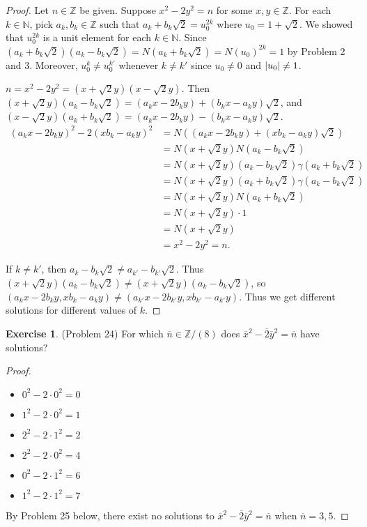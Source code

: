 \documentclass[12pt, psamsfonts]{amsart}
\theoremstyle{definition}
\newtheorem*{exer}{Exercise}
\theoremstyle{remark}
\numberwithin{equation}{section}
\begin{document}
\begin{proof}
  Let $n \in \mathbb{Z}$ be given.
  Suppose $x^2 - 2y^2 = n$ for some $x, y \in \mathbb{Z}$.
  For each $k \in \mathbb{N}$, pick $a_k, b_k \in \mathbb{Z}$ such that $a_k + b_k\sqrt{2} = u_0^{2k}$ where $u_0 = 1 + \sqrt{2}$.
  We showed that $u_0^{2k}$ is a unit element for each $k \in \mathbb{N}$.
  Since $(a_k + b_k\sqrt{2})(a_k - b_k\sqrt{2}) = N(a_k + b_k\sqrt{2}) = N(u_0)^{2k} = 1$ by Problem 2 and 3.
  Moreover, $u_0^k \ne u_0^{k'}$ whenever $k \ne k'$ since $u_0 \ne 0$ and $\abs{u_0} \ne 1$.

  $n = x^2 - 2y^2 = (x + \sqrt{2}y)(x - \sqrt{2}y)$.
  Then $(x + \sqrt{2}y)(a_k - b_k\sqrt{2}) = (a_kx - 2b_ky) + (b_kx - a_ky)\sqrt{2}$, and $(x - \sqrt{2}y)(a_k + b_k\sqrt{2}) = (a_kx - 2b_ky) - (b_kx - a_ky)\sqrt{2}$.
  \begin{align*}
    (a_kx - 2b_ky)^2 - 2(xb_k - a_ky)^2
      &= N((a_kx - 2b_ky) + (xb_k - a_ky)\sqrt{2}) \\
      &= N(x + \sqrt{2}y)N(a_k - b_k\sqrt{2}) \\
      &= N(x + \sqrt{2}y)(a_k - b_k\sqrt{2})\gamma(a_k + b_k\sqrt{2}) \\
      &= N(x + \sqrt{2}y)(a_k + b_k\sqrt{2})\gamma(a_k - b_k\sqrt{2}) \\
      &= N(x + \sqrt{2}y)N(a_k + b_k\sqrt{2}) \\
      &= N(x + \sqrt{2}y) \cdot 1 \\
      &= N(x + \sqrt{2}y) \\
      &= x^2 - 2y^2 = n.
  \end{align*}

  If $k \ne k'$, then $a_k - b_k\sqrt{2} \ne a_{k'} - b_{k'}\sqrt{2}$.
  Thus $(x + \sqrt{2}y)(a_k - b_k\sqrt{2}) \ne (x + \sqrt{2}y)(a_k - b_k\sqrt{2})$, so $(a_kx - 2b_ky, xb_k - a_ky) \ne (a_{k'}x - 2b_{k'}y, xb_{k'} - a_{k'}y)$.
  Thus we get different solutions for different values of $k$.

\end{proof}

\begin{exer}{(Problem 24)}
  For which $\overline{n} \in \mathbb{Z}/(8)$ does $\overline{x}^2 - \overline{2}\overline{y}^2 = \overline{n}$ have solutions?
\end{exer}

\begin{proof}
  $ $
  \begin{itemize}
    \item $0^2 - 2 \cdot 0^2 = 0$
    \item $1^2 - 2 \cdot 0^2 = 1$
    \item $2^2 - 2 \cdot 1^2 = 2$
    \item $2^2 - 2 \cdot 0^2 = 4$
    \item $0^2 - 2 \cdot 1^2 = 6$
    \item $1^2 - 2 \cdot 1^2 = 7$
  \end{itemize}
  By Problem 25 below, there exist no solutions to $\overline{x}^2 - \overline{2}\overline{y}^2 = \overline{n}$ when $\overline{n} = 3, 5$.

\end{proof}
\end{document}
